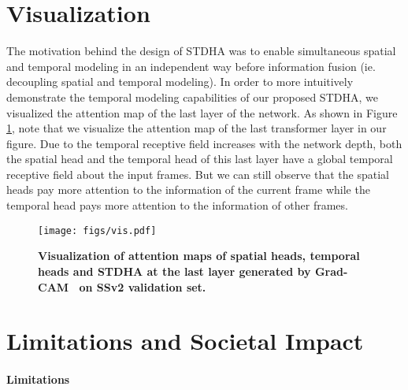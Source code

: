 \section{Visualization}
\label{sec:vis}

 The motivation behind the design of STDHA was to enable simultaneous spatial and temporal modeling in an independent way before information fusion (ie. decoupling spatial and temporal modeling). In order to more intuitively demonstrate the temporal modeling capabilities of our proposed STDHA, we visualized the attention map of the last layer of the network. As shown in Figure \ref{fig:vis}, note that we visualize the attention map of the last transformer layer in our figure. Due to the temporal receptive field increases with the network depth, both the spatial head and the temporal head of this last layer have a global temporal receptive field about the input frames. But we can still observe that the spatial heads pay more attention to the information of the current frame while the temporal head pays more attention to the information of other frames.

\begin{figure}[ht]
    \centering
    \texttt{[image: figs/vis.pdf]}
    \caption{ \textbf{Visualization of attention maps of spatial heads, temporal heads and STDHA at the last layer generated by Grad-CAM~\citep{gradcam} on SSv2 validation set.}}
    \label{fig:vis}
    
\end{figure} 

\section{Limitations and Societal Impact}
\label{sec:impact}
\paragraph{Limitations}

